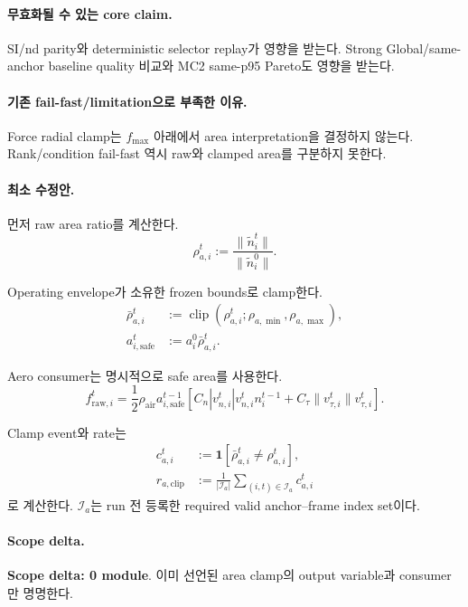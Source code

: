 \documentclass[11pt]{article}
\newcommand{\scopezero}{\textcolor{SafeGreen}{\textbf{Scope delta: 0 module}}}
\begin{document}
\paragraph{무효화될 수 있는 core claim.}
SI/nd parity와 deterministic selector replay가 영향을 받는다.
Strong Global/same-anchor baseline quality 비교와 MC2 same-p95 Pareto도 영향을 받는다.

\paragraph{기존 fail-fast/limitation으로 부족한 이유.}
Force radial clamp는 $f_{\max}$ 아래에서 area interpretation을 결정하지 않는다.
Rank/condition fail-fast 역시 raw와 clamped area를 구분하지 못한다.

\paragraph{최소 수정안.}
먼저 raw area ratio를 계산한다.
\begin{equation}
  \rho_{a,i}^t
  :=
  \frac{\|\widetilde n_i^t\|}{\|\widetilde n_i^0\|}.
\end{equation}

Operating envelope가 소유한 frozen bounds로 clamp한다.
\begin{align}
  \bar\rho_{a,i}^t
  &:=
  \operatorname{clip}
  \left(\rho_{a,i}^t;\rho_{a,\min},\rho_{a,\max}\right),\\
  a_{i,\mathrm{safe}}^t
  &:=
  a_i^0\bar\rho_{a,i}^t.
\end{align}

Aero consumer는 명시적으로 safe area를 사용한다.
\begin{equation}
  f_{\mathrm{raw},i}^t
  =
  \frac12\rho_{\mathrm{air}}a_{i,\mathrm{safe}}^{t-1}
  \left[
  C_n|v_{n,i}^t|v_{n,i}^tn_i^{t-1}
  +C_\tau\|v_{\tau,i}^t\|v_{\tau,i}^t
  \right].
\end{equation}

Clamp event와 rate는
\begin{align}
  c_{a,i}^t
  &:=
  \mathbf 1[\bar\rho_{a,i}^t\neq\rho_{a,i}^t],\\
  r_{a,\mathrm{clip}}
  &:=
  \frac{1}{|\mathcal I_a|}
  \sum_{(i,t)\in\mathcal I_a}c_{a,i}^t
\end{align}
로 계산한다. $\mathcal I_a$는 run 전 등록한 required valid anchor--frame index set이다.

\paragraph{Scope delta.}
\scopezero. 이미 선언된 area clamp의 output variable과 consumer만 명명한다.
\end{document}
